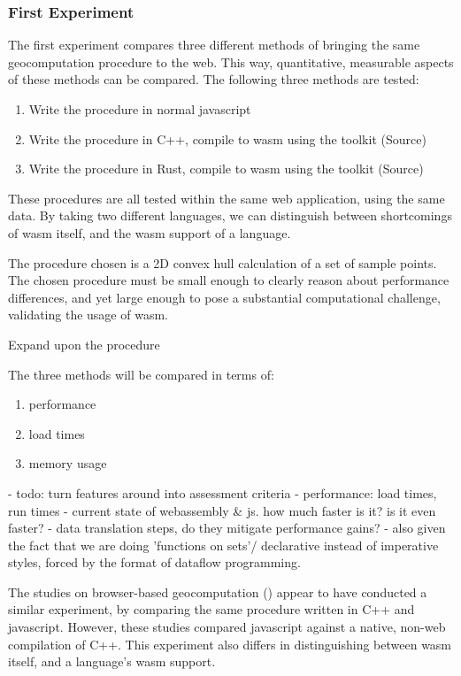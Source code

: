 \subsubsection{First Experiment}
The first experiment compares three different methods of bringing the same geocomputation procedure to the web. 
This way, quantitative, measurable aspects of these methods can be compared. 
The following three methods are tested:
\begin{enumerate}[-]
  \item Write the procedure in normal javascript
  \item Write the procedure in C++, compile to wasm using the  toolkit (Source)
  \item Write the procedure in Rust, compile to wasm using the  toolkit (Source)
\end{enumerate}
These procedures are all tested within the same web application, using the same data. 
By taking two different languages, we can distinguish between shortcomings of \ac{wasm} itself, and the \ac{wasm} support of a language.  

The procedure chosen is a 2D convex hull calculation of a set of sample points. 
The chosen procedure must be small enough to clearly reason about performance differences, and yet large enough to pose a substantial computational challenge, validating the usage of \ac{wasm}.

\begin{note}
  Expand upon the procedure
\end{note}

The three methods will be compared in terms of:
\begin{enumerate}[-]
  \item performance
  \item load times
  \item memory usage
\end{enumerate}

\begin{note}
  - todo: turn features around into assessment criteria
  - performance: load times, run times
  - current state of webassembly & js. how much faster is it? is it even faster? 
     - data translation steps, do they mitigate performance gains? 
     - also given the fact that we are doing 'functions on sets'/ declarative instead of imperative styles, forced by the format of dataflow programming. 
\end{note}

The studies on browser-based geocomputation () appear to have conducted a similar experiment, by comparing the same procedure written in C++ and javascript. 
However, these studies compared javascript against a native, non-web compilation of C++. 
This experiment also differs in distinguishing between \ac{wasm} itself, and a language's \ac{wasm} support.

